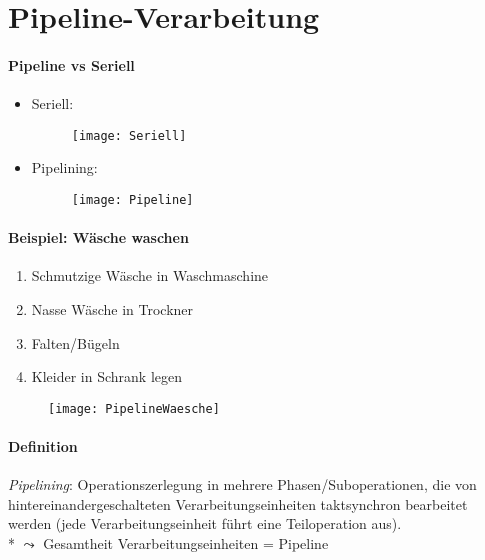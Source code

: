 \section{Pipeline-Verarbeitung}
\label{sec:pipelining}

\paragraph{Pipeline vs Seriell}
\begin{itemize}
  \item Seriell:
  \begin{figure}[ht]
    \centering
    \texttt{[image: Seriell]}
    \label{Seriell}
  \end{figure}
  \item Pipelining:
  \begin{figure}[ht]
    \centering
    \texttt{[image: Pipeline]}
    \label{Pipeline}
  \end{figure}
\end{itemize}

\paragraph{Beispiel: Wäsche waschen}
\begin{enumerate}
  \item Schmutzige Wäsche in Waschmaschine
  \item Nasse Wäsche in Trockner
  \item Falten/Bügeln
  \item Kleider in Schrank legen
\end{enumerate}
\begin{figure}[ht]
  \centering
  \label{PipelineWaesche}
  \texttt{[image: PipelineWaesche]}
\end{figure}

\paragraph{Definition} \emph{Pipelining}: Operationszerlegung in mehrere Phasen/Suboperationen, die von hintereinandergeschalteten Verarbeitungseinheiten taktsynchron bearbeitet werden (jede Verarbeitungseinheit führt eine Teiloperation aus). \\*
$\leadsto$ Gesamtheit Verarbeitungseinheiten = Pipeline


